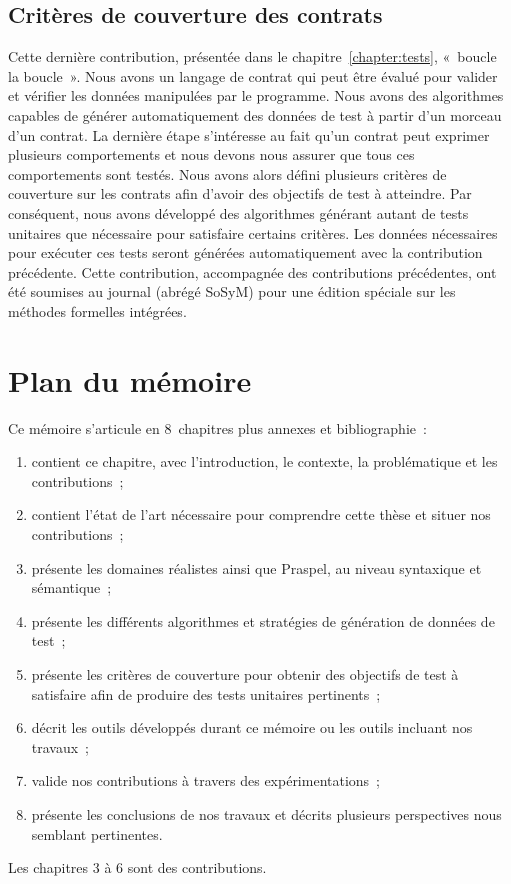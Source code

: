 \subsection{Critères de couverture des contrats}

Cette dernière contribution, présentée dans le chapitre~\ref{chapter:tests},
«~boucle la boucle~». Nous avons un langage de contrat qui peut être évalué pour
valider et vérifier les données manipulées par le programme. Nous avons des
algorithmes capables de générer automatiquement des données de test à partir
d'un morceau d'un contrat. La dernière étape s'intéresse au fait qu'un contrat
peut exprimer plusieurs comportements et nous devons nous assurer que tous ces
comportements sont testés. Nous avons alors défini plusieurs critères de
couverture sur les contrats afin d'avoir des objectifs de test à atteindre. Par
conséquent, nous avons développé des algorithmes générant autant de tests
unitaires que nécessaire pour satisfaire certains critères. Les données
nécessaires pour exécuter ces tests seront générées automatiquement avec la
contribution précédente. Cette contribution, accompagnée des contributions
précédentes, ont été soumises au journal  (abrégé SoSyM) pour une édition spéciale sur les méthodes formelles
intégrées.

\section{Plan du mémoire}

Ce mémoire s'articule en 8~chapitres plus annexes et bibliographie~:
%
\begin{enumerate}

\item contient ce chapitre, avec l'introduction, le contexte, la problématique
et les contributions~;

\item contient l'état de l'art nécessaire pour comprendre cette thèse et situer
nos contributions~;

\item présente les domaines réalistes ainsi que Praspel, au niveau syntaxique et
sémantique~;

\item présente les différents algorithmes et stratégies de génération de données
de test~;

\item présente les critères de couverture pour obtenir des objectifs de test à
satisfaire afin de produire des tests unitaires pertinents~;

\item décrit les outils développés durant ce mémoire ou les outils incluant nos
travaux~;

\item valide nos contributions à travers des expérimentations~;

\item présente les conclusions de nos travaux et décrits plusieurs perspectives
nous semblant pertinentes.

\end{enumerate}
%
Les chapitres 3 à 6 sont des contributions.
